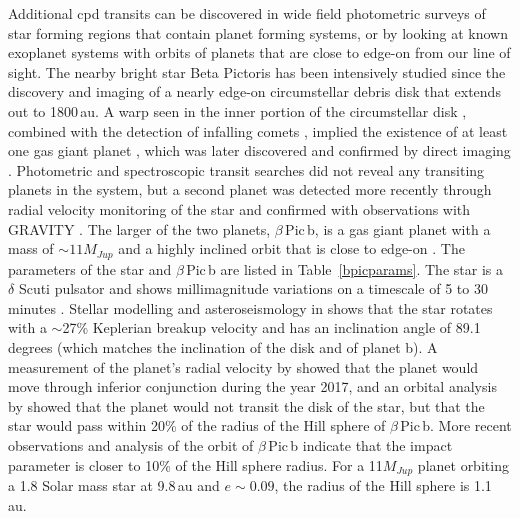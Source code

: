 \documentclass[longauth]{aa} %
\newcommand{\bpb}{$\beta$\,Pic\,b}
\newcommand{\bp}{$\beta$\,Pic}
\begin{document}
Additional \ac{cpd} transits can be discovered in wide field photometric surveys of star forming regions that contain planet forming systems, or by looking at known exoplanet systems with orbits of planets that are close to edge-on from our line of sight.
%
The nearby bright star Beta Pictoris{} \citep[\bp{}; $d$\,=\,19.44\,pc,  $V$\,=\,3.85;][]{vanLeeuwen07b} has been intensively studied since the discovery and imaging of a nearly edge-on circumstellar debris disk \citep{Smith84,Kalas95} that extends out to 1800\,au.
%
A warp seen in the inner portion of the circumstellar disk \citep{Heap00}, combined with the detection of infalling comets \citep[see references in ][]{Kiefer14}, implied the existence of at least one gas giant planet \citep{Mouillet97,Augereau01}, which was later discovered and confirmed by direct imaging \citep{Lagrange09,Lagrange10}.
%
Photometric \citep{Lous18} and spectroscopic transit searches \citep{vanSluijs19} did not reveal any transiting planets in the system, but a second planet was detected more recently through radial velocity monitoring of the star \citep{Lagrange19} and confirmed with observations with GRAVITY \citep{Nowak20,Lagrange20}.
%
The larger of the two planets, \bpb{}, is a gas giant planet with a mass of $\sim 11 M_{Jup}$ \citep{Lagrange20} and a highly inclined orbit that is close to edge-on \citep{Millar-Blanchaer15,Wang16,Nielsen20,Lagrange20}.
%
The parameters of the star and \bpb{} are listed in Table~\ref{bpicparams}.
%
The star is a $\delta$ Scuti pulsator and shows millimagnitude variations on a timescale of 5 to 30 minutes \citep{koen2003a,koen2003b,Merkania17,Zwintz19}.
%
Stellar modelling and asteroseismology in \citet{Zwintz19} shows that the star rotates with a $\sim$27\% Keplerian breakup velocity and has an inclination angle of 89.1 degrees (which matches the inclination of the disk and of planet b).
%
A measurement of the planet's radial velocity by \citet{Snellen14} showed that the planet would move through inferior conjunction during the year 2017, and an orbital analysis by \citet{Wang16} showed that the planet would not transit the disk of the star, but that the star would pass within 20\% of the radius of the Hill sphere of \bpb{}.
%
More recent observations and analysis of the orbit of \bpb{} \citep{Lagrange19,Nielsen20} indicate that the impact parameter is closer to 10\% of the Hill sphere radius.
%
For a 11$M_{Jup}$ planet orbiting a 1.8 Solar mass star at 9.8\,au and $e\sim 0.09$, the radius of the Hill sphere is 1.1\,au.

%
%
\end{document}
